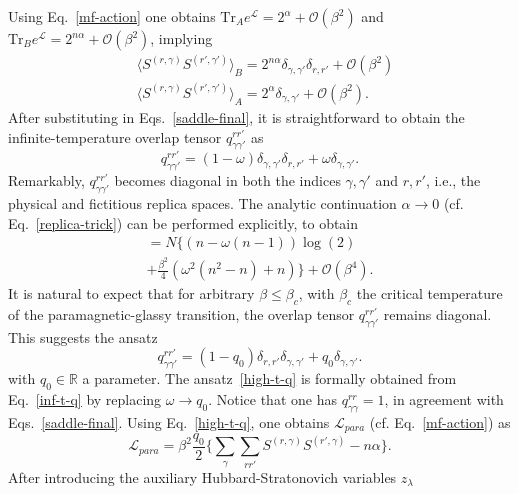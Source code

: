 \documentclass[twocolumn,superscriptaddress,prb,10pt]{revtex4-1}
\def\tr{\textrm{Tr}}
\begin{document}
Using Eq.~\eqref{mf-action} one obtains  $\tr_Ae^{{\mathcal L}}=
2^{\alpha}+{\mathcal O}(\beta^2)$ and $\tr_B e^{{\mathcal L}}=2^{n\alpha}+
{\mathcal O}(\beta^2)$, implying  
%
\begin{align}
& \langle S^{(r,\gamma)}S^{(r',\gamma')}\rangle_B=2^{n\alpha}
\delta_{\gamma,\gamma'}\delta_{r,r'}+{\mathcal O}(\beta^2)\\\nonumber
& \langle S^{(r,\gamma)}S^{(r',\gamma')}\rangle_A=2^{\alpha}
\delta_{\gamma,\gamma'}+{\mathcal O}(\beta^2).
\end{align}
%
After substituting in Eqs.~\eqref{saddle-final}, it is straightforward to 
obtain the infinite-temperature overlap tensor $q_{\gamma\gamma'}^{rr'}$ 
as 
%
\begin{equation}
q_{\gamma\gamma'}^{rr'}=(1-\omega)\delta_{\gamma,\gamma'}\delta_{r,r'}+
\omega\delta_{\gamma,\gamma'}.
\label{inf-t-q}
\end{equation}
%
Remarkably, $q_{\gamma\gamma'}^{rr'}$ becomes diagonal in both the 
indices $\gamma,\gamma'$ and $r,r'$, i.e.,  the physical and 
fictitious replica spaces. The analytic continuation $\alpha\to 0$ 
(cf. Eq.~\eqref{replica-trick}) can be performed explicitly, to obtain 
%
\begin{multline}
[F_{para}(\omega,n,\beta)]=N\Big\{(n-\omega(n-1))\log(2)\\
+\frac{\beta^2}{4}(\omega^2(n^2-n)+n)\Big\}+
{\mathcal O}(\beta^4).
\label{logZ-ht}
\end{multline}
% 
It is natural to expect that for arbitrary $\beta\le\beta_c$, with 
$\beta_c$ the critical temperature of the paramagnetic-glassy 
transition, the overlap tensor $q_{\gamma\gamma'}^{rr'}$ remains 
diagonal. This suggests the ansatz 
%
\begin{equation}
q_{\gamma\gamma'}^{rr'}=(1-q_0)\delta_{r,r'}\delta_{\gamma,\gamma'}+
q_0\delta_{\gamma,\gamma'}.
\label{high-t-q}
\end{equation}
%
with $q_0\in {\mathbb R}$ a parameter. The ansatz~\eqref{high-t-q} is formally 
obtained from Eq.~\eqref{inf-t-q} by replacing $\omega\to q_0$. Notice that 
one has $q_{\gamma\gamma}^{rr}=1$, in agreement with Eqs.~\eqref{saddle-final}. 
Using Eq.~\eqref{high-t-q}, one obtains ${\mathcal L}_{para}$ (cf. 
Eq.~\eqref{mf-action}) as   
%
\begin{equation}
\label{high-t-action}
{\mathcal L}_{para}=\beta^2\frac{q_0}{2}\Big\{\sum_\gamma\sum_{rr'}S^{(r,
\gamma)}S^{(r',\gamma)}-n\alpha\Big\}.
\end{equation}
%
After introducing the auxiliary Hubbard-Stratonovich variables $z_\lambda$ 
\end{document}

